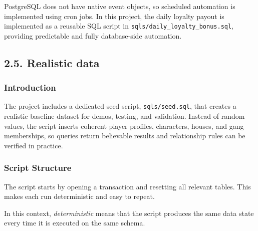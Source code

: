 PostgreSQL does not have native event objects, so scheduled automation
is implemented using cron jobs. In this project, the daily loyalty
payout is implemented as a reusable SQL script in
\texttt{sqls/daily\_loyalty\_bonus.sql}, providing predictable and fully
database-side automation.

\newpage

\hypertarget{realistic-data}{%
\subsection{2.5. Realistic data}\label{realistic-data}}

\hypertarget{introduction-2}{%
\subsubsection{Introduction}\label{introduction-2}}

The project includes a dedicated seed script, \texttt{sqls/seed.sql},
that creates a realistic baseline dataset for demos, testing, and
validation. Instead of random values, the script inserts coherent player
profiles, characters, houses, and gang memberships, so queries return
believable results and relationship rules can be verified in practice.

\hypertarget{script-structure}{%
\subsubsection{Script Structure}\label{script-structure}}

The script starts by opening a transaction and resetting all relevant
tables. This makes each run deterministic and easy to repeat.

In this context, \emph{deterministic} means that the script produces the
same data state every time it is executed on the same schema.

\begin{Shaded}
\begin{Highlighting}[]
\NormalTok{;}
 
    \NormalTok{,}
\NormalTok{;}
\end{Highlighting}
\end{Shaded}

